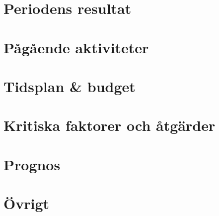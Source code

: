 \section{Periodens resultat}

\section{Pågående aktiviteter}

\section{Tidsplan \& budget}

\section{Kritiska faktorer och åtgärder}

\section{Prognos}

\section{Övrigt}